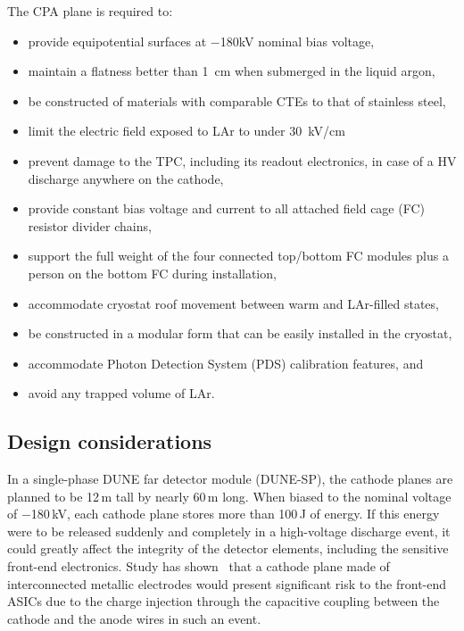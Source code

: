 The CPA plane is required to:
\begin{itemize}
\item provide equipotential surfaces at $-$180kV nominal bias voltage,
\item maintain a flatness better than 1~cm when submerged in the liquid argon,
\item be constructed of materials with comparable CTEs to that of stainless steel, 
\item limit the electric field exposed to LAr to under 30~kV/cm 
\item prevent damage to the TPC, including its readout electronics, in case of a HV discharge anywhere on the cathode,
\item provide constant bias voltage and current to all attached field cage (FC) resistor divider chains,
\item support the full weight of the four connected top/bottom FC modules plus a person on the bottom FC during installation,
\item accommodate cryostat roof movement between warm and LAr-filled states,
\item be constructed in a modular form that can be easily installed in the cryostat,
\item accommodate Photon Detection System (PDS) calibration features, and
\item avoid any trapped volume of LAr.
\end{itemize}

\subsection{Design considerations}


In a single-phase DUNE far detector module (DUNE-SP), the cathode planes are planned to be 12\,m tall by nearly 60\,m long.  When biased to the nominal voltage of $-$180\,kV, each cathode plane stores more than 100\,J of energy. If this energy were to be released  suddenly and completely in a high-voltage discharge event, it could greatly affect the integrity of the detector elements, including the sensitive front-end electronics.  
Study has shown~\cite{cathode-hv-1320} that a cathode plane made of interconnected metallic electrodes would present significant risk to the front-end ASICs due to the charge injection through the capacitive coupling between the cathode and the anode wires in such an event.  

